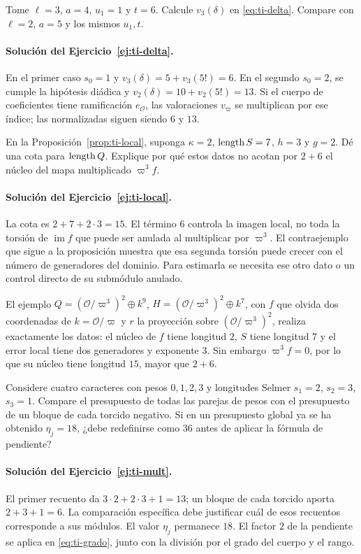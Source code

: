 \begin{ejercicio}\label{ej:ti-delta}
Tome $\ell=3$, $a=4$, $u_1=1$ y $t=6$.
Calcule $v_3(\delta)$ en \eqref{eq:ti-delta}.
Compare con $\ell=2$, $a=5$ y los mismos $u_1,t$.
\end{ejercicio}
\paragraph{Solución del Ejercicio~\ref{ej:ti-delta}.}
En el primer caso $s_0=1$ y
$v_3(\delta)=5+v_3(5!)=6$.
En el segundo $s_0=2$, se cumple la hipótesis diádica y
$v_2(\delta)=10+v_2(5!)=13$.
Si el cuerpo de coeficientes tiene ramificación
$e_{\mathcal O}$, las valoraciones $v_\varpi$ se multiplican
por ese índice; las normalizadas siguen siendo $6$ y $13$.

\begin{ejercicio}\label{ej:ti-local}
En la Proposición~\ref{prop:ti-local}, suponga
$\kappa=2$, $\operatorname{length} S=7$, $h=3$ y $g=2$.
Dé una cota para $\operatorname{length} Q$. Explique por qué estos datos
no acotan por $2+6$ el núcleo del mapa multiplicado
$\varpi^3f$.
\end{ejercicio}
\paragraph{Solución del Ejercicio~\ref{ej:ti-local}.}
La cota es $2+7+2\cdot3=15$.
El término $6$ controla la imagen local, no toda la torsión
de $\operatorname{im}f$ que puede ser anulada al multiplicar
por $\varpi^3$. El contraejemplo que sigue a la proposición
muestra que esa segunda torsión puede crecer con el número
de generadores del dominio. Para estimarla se necesita ese
otro dato o un control directo de su submódulo anulado.

El ejemplo $Q=(\mathcal O/\varpi^3)^2\oplus k^9$,
$H=(\mathcal O/\varpi^3)^2\oplus k^7$, con $f$ que olvida
dos coordenadas de $k=\mathcal O/\varpi$ y $r$ la proyección
sobre $(\mathcal O/\varpi^3)^2$, realiza exactamente los datos:
el núcleo de $f$ tiene longitud $2$, $S$ tiene longitud $7$
y el error local tiene dos generadores y exponente $3$.
Sin embargo $\varpi^3f=0$, por lo que su núcleo tiene longitud
$15$, mayor que $2+6$.

\begin{ejercicio}\label{ej:ti-mult}
Considere cuatro caracteres con pesos $0,1,2,3$ y longitudes
Selmer $s_1=2$, $s_2=3$, $s_3=1$.
Compare el presupuesto de todas las parejas de pesos con el
presupuesto de un bloque de cada torcido negativo. Si en un
presupuesto global ya se ha obtenido $\eta_j=18$, ¿debe
redefinirse como $36$ antes de aplicar la fórmula de pendiente?
\end{ejercicio}
\paragraph{Solución del Ejercicio~\ref{ej:ti-mult}.}
El primer recuento da $3\cdot2+2\cdot3+1=13$;
un bloque de cada torcido aporta $2+3+1=6$.
La comparación específica debe justificar cuál de esos
recuentos corresponde a sus módulos.
El valor $\eta_j$ permanece $18$. El factor $2$ de la
pendiente se aplica en \eqref{eq:ti-grado}, junto con la
división por el grado del cuerpo y el rango.
